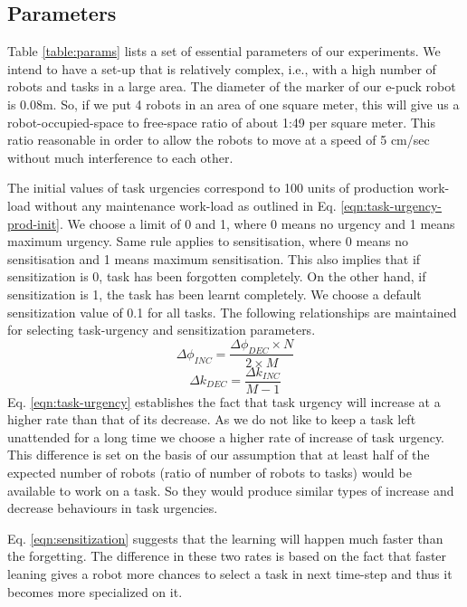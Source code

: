 \documentclass[preprint,12pt]{elsarticle}
\begin{document}
\subsection{Parameters}
Table \ref{table:params} lists a set of essential parameters of our experiments. We intend to have a set-up that is relatively complex, i.e., with a high number of robots and tasks in a large area. The diameter of the marker of our e-puck robot is 0.08m. So, if we put 4 robots in an area of one square meter, this will give us a robot-occupied-space to free-space ratio of about 1:49 per square meter. This ratio reasonable in order to allow the robots to move at a speed of 5 cm/sec without much interference to each other. 

The initial values of task urgencies correspond to 100 units of production work-load without any maintenance work-load as outlined in Eq. \ref{eqn:task-urgency-prod-init}. We choose a limit of 0 and 1, where 0 means no urgency and 1 means maximum urgency. Same rule applies to sensitisation, where 0 means no sensitisation and 1 means maximum sensitisation. This also implies that if sensitization is 0, task has been forgotten completely. On the other hand, if sensitization is 1, the task has been learnt completely. We choose a default sensitization value of 0.1 for all tasks. The following relationships are maintained for selecting task-urgency and sensitization parameters.
\begin{equation}
\Delta\phi_{INC} = \frac{\Delta\phi_{DEC} \times N}{2 \times M}
\label{eqn:task-urgency}
\end{equation}
%
\begin{equation}
\Delta k_{DEC} = \frac{\Delta k_{INC}} {M - 1} 
\label{eqn:sensitization}
\end{equation}
%
Eq. \ref{eqn:task-urgency} establishes the fact that task urgency will increase at a higher rate than that of its decrease. As we do not like to keep a task left unattended for a long time we choose a higher rate of increase of task urgency. This difference is set on the basis of our assumption that at least half of the expected number of robots (ratio of number of robots to tasks) would be available to work on a task. So they would produce similar types of increase and decrease behaviours in task urgencies.

Eq. \ref{eqn:sensitization} suggests that the learning will happen much faster than the forgetting. The difference in these two rates is based on the fact that faster leaning gives a robot more chances to select a task in next time-step and thus it becomes more specialized on it. 
\end{document}
